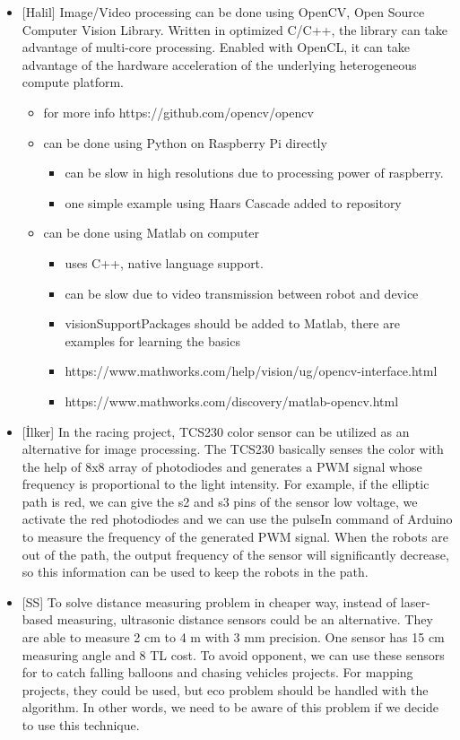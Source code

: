 \documentclass[a4paper,12pt]{article}
\begin{document}
\begin{itemize}
\begin{itemize}
		\end{itemize}
	\item {[Halil]} Image/Video processing can be done using OpenCV, Open Source Computer Vision Library. Written in optimized C/C++, the library can take advantage of multi-core processing. Enabled with OpenCL, it can take advantage of the hardware acceleration of the underlying heterogeneous compute platform.
		\begin{itemize}
			\item for more info https://github.com/opencv/opencv
			\item can be done using Python on Raspberry Pi directly
				\begin{itemize}
					\item can be slow in high resolutions due to processing power of raspberry.
					\item one simple example using Haars Cascade added to repository
				\end{itemize}
			\item can be done using Matlab on computer
				\begin{itemize}
					\item uses C++, native language support.
					\item can be slow due to video transmission between robot and device
					\item visionSupportPackages should be added to Matlab, there are examples for learning the basics
					\item https://www.mathworks.com/help/vision/ug/opencv-interface.html
					\item https://www.mathworks.com/discovery/matlab-opencv.html
				\end{itemize}
		\end{itemize}
	\item {[İlker]} In the racing project, TCS230 color sensor can be utilized as an alternative for image processing. The TCS230 basically senses the color with the help of 8x8 array of photodiodes and generates a PWM signal whose frequency is proportional to the light intensity. For example, if the elliptic path is red, we can give the s2 and s3 pins of the sensor low voltage, we activate the red photodiodes and we can use the pulseIn command of Arduino to measure the frequency of the generated PWM signal. When the robots are out of the path, the output frequency of the sensor will significantly decrease, so this information can be used to keep the robots in the path.  	  


	\item {[SS]} To solve distance measuring problem in cheaper way, instead of laser-based measuring, ultrasonic distance sensors could be an alternative. They are able to measure 2 cm to 4 m with 3 mm precision. One sensor has 15 cm measuring angle and 8 TL cost. To avoid opponent, we can use these sensors for to catch falling balloons and chasing vehicles projects. For mapping projects, they could be used, but eco problem should be handled with the algorithm. In other words, we need to be aware of this problem if we decide to use this technique. 
\end{itemize}
\end{document}
